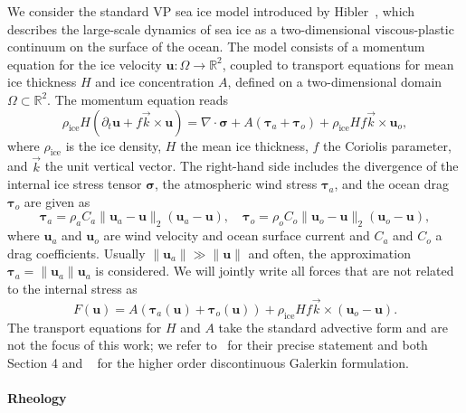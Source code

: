\documentclass[11pt]{article}
\newcommand{\bu}{\mathbf{u}}
\newcommand{\sig}{\boldsymbol{\sigma}}
\newcommand{\btau}{\boldsymbol{\tau}}
\begin{document}
We consider the standard VP sea ice model introduced by Hibler~\cite{Hibler1979}, which describes the large-scale dynamics of sea ice as a two-dimensional viscous-plastic continuum on the surface of the ocean. The model consists of a momentum equation for the ice velocity $\bu : \Omega \to \mathbb{R}^2$, coupled to transport equations for mean ice thickness $H$ and ice concentration
$A$, defined on a two-dimensional domain $\Omega \subset \mathbb{R}^2$. The momentum equation reads
%
\begin{equation}
  \rho_{\mathrm{ice}} H \left( \partial_t \bu
  + f \vec k \times \bu \right)
  = \nabla \cdot \sig + A(\btau_a + \btau_o) + \rho_{\mathrm{ice}} H f \vec k \times \bu_o,
  \label{eq:momentum}
\end{equation}
%
where $\rho_{\mathrm{ice}}$ is the ice density, $H$ the mean ice thickness, $f$ the Coriolis parameter, and $\vec{k}$ the unit vertical vector. The right-hand side includes the divergence of the internal ice stress tensor $\sig$, the atmospheric wind stress $\btau_a$, and the ocean drag $\btau_o$ are given as
%
\begin{equation}
\btau_a = \rho_a C_a\|\bu_a-\bu\|_2(\bu_a-\bu),\quad
\btau_o = \rho_o C_o\|\bu_o-\bu\|_2(\bu_o-\bu),
\end{equation}
where $\bu_a$ and $\bu_o$ are wind velocity and ocean surface current and $C_a$ and $C_o$ a drag coefficients. Usually $\|\bu_a\|\gg \|\bu\|$ and often, the approximation $\btau_a=\|\bu_a\|\bu_a$ is considered. We will jointly write all forces that are not related to the internal stress as
%
\begin{equation}\label{forces}
F(\bu) = A(\btau_a(\bu)+\btau_o(\bu)) + \rho_\text{ice} H f\vec k\times(\bu_o-\bu).
\end{equation}
%
The transport equations for $H$ and $A$ take the standard advective form and are not the focus of this work; we refer
to~\cite{Hibler1979,Hibler1980} for their precise statement and both Section 4 and ~\cite{richter2023dynamical} for the higher order discontinuous Galerkin formulation.

\paragraph{Rheology}
\end{document}

